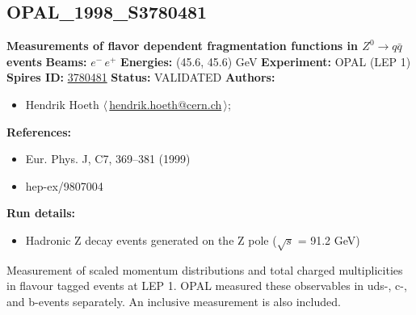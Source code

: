 \subsection[OPAL\_1998\_S3780481]{OPAL\_1998\_S3780481\,\cite{Ackerstaff:1998hz}}
\textbf{Measurements of flavor dependent fragmentation functions in $Z^0 \ensuremath{\to} q \bar{q}$ events}\newline
\textbf{Beams:} $e^-$\,$e^+$ \newline
\textbf{Energies:} (45.6, 45.6) GeV \newline
\textbf{Experiment:} OPAL (LEP 1) \newline
\textbf{Spires ID:} \href{http://www.slac.stanford.edu/spires/find/hep/www?rawcmd=key+3780481}{3780481}\newline
\textbf{Status:} VALIDATED\newline
\textbf{Authors:}
\begin{itemize}
  \item Hendrik Hoeth $\langle\,$\href{mailto:hendrik.hoeth@cern.ch}{hendrik.hoeth@cern.ch}$\,\rangle$;
\end{itemize}
\textbf{References:}
\begin{itemize}
  \item Eur. Phys. J, C7, 369--381 (1999)
  \item hep-ex/9807004
\end{itemize}
\textbf{Run details:}
\begin{itemize}

  \item Hadronic Z decay events generated on the Z pole (\ensuremath{\sqrt{s}} = 91.2 GeV)\end{itemize}

\noindent Measurement of scaled momentum distributions and total charged multiplicities in flavour tagged events at LEP 1. OPAL measured these observables in uds-, c-, and b-events separately. An inclusive measurement is also included.

\clearpage


\clearpage

